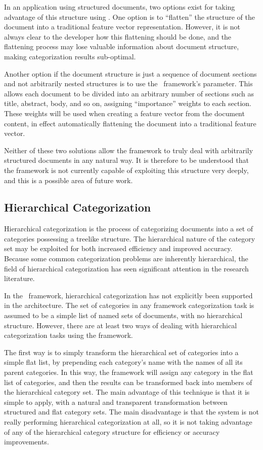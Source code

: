 In an application using structured documents, two options exist for
taking advantage of this structure using \aicat.  One option is to
``flatten'' the structure of the document into a traditional feature
vector representation.  However, it is not always clear to the
developer how this flattening should be done, and the flattening
process may lose valuable information about document structure, making
categorization results sub-optimal.

Another option if the document structure is just a sequence of
document sections and not arbitrarily nested structures is to use the
\aicat\ framework's  parameter.  This allows
each document to be divided into an arbitrary number of sections such
as title, abstract, body, and so on, assigning ``importance'' weights
to each section.  These weights will be used when creating a feature
vector from the document content, in effect automatically flattening
the document into a traditional feature vector.

Neither of these two solutions allow the framework to truly deal with
arbitrarily structured documents in any natural way.  It is therefore
to be understood that the framework is not currently capable of
exploiting this structure very deeply, and this is a possible area of
future work.

\subsection{Hierarchical Categorization}
\label{hierarchical}

Hierarchical categorization is the process of categorizing documents
into a set of categories possessing a treelike structure.  The
hierarchical nature of the category set may be exploited for both
increased efficiency and improved accuracy. \cite{dumais:00}  Because
some common categorization problems are inherently hierarchical, the
field of hierarchical categorization has seen significant attention in
the research literature. \cite[p. 7]{sebastiani:02}

In the \aicat\ framework, hierarchical categorization has not
explicitly been supported in the architecture.  The set of categories
in any framework categorization task is assumed to be a simple list of
named sets of documents, with no hierarchical structure.  However,
there are at least two ways of dealing with hierarchical
categorization tasks using the framework.

The first way is to simply transform the hierarchical set of
categories into a simple flat list, by prepending each category's name
with the names of all its parent categories.  In this way, the
framework will assign any category in the flat list of categories, and
then the results can be transformed back into members of the
hierarchical category set.  The main advantage of this technique is
that it is simple to apply, with a natural and transparent
transformation between structured and flat category sets.  The main
disadvantage is that the system is not really performing hierarchical
categorization at all, so it is not taking advantage of any of the
hierarchical category structure for efficiency or accuracy
improvements.

